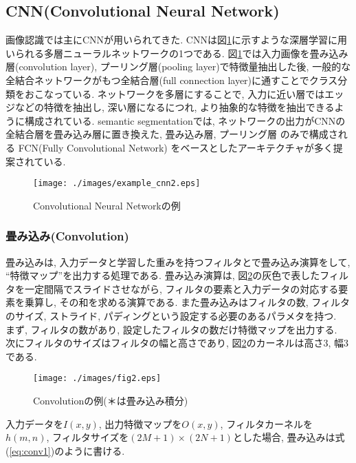 \subsection{CNN(Convolutional Neural Network)}\label{subsec:cnn}
画像認識では主にCNN\cite{cnn}が用いられてきた. CNNは図\ref{fig:conv_ex}に示すような深層学習に用いられる多層ニューラルネットワークの1つである. 図\ref{fig:conv_ex}では入力画像を畳み込み層(convolution layer), プーリング層(pooling layer)で特徴量抽出した後, 一般的な全結合ネットワークがもつ全結合層(full connection layer)に通すことでクラス分類をおこなっている. ネットワークを多層にすることで, 入力に近い層ではエッジなどの特徴を抽出し, 深い層になるにつれ, より抽象的な特徴を抽出できるように構成されている. semantic segmentationでは, ネットワークの出力がCNNの全結合層を畳み込み層に置き換えた, 畳み込み層, プーリング層 のみで構成される FCN(Fully Convolutional Network)\cite{long2015fully} をベースとしたアーキテクチャが多く提案されている. 
\begin{figure}[H]
  \centering
  \texttt{[image: ./images/example\_cnn2.eps]}
  \caption{Convolutional Neural Networkの例}
  \label{fig:conv_ex}
\end{figure}
\subsubsection*{畳み込み(Convolution)}
畳み込みは, 入力データと学習した重みを持つフィルタとで畳み込み演算をして, ``特徴マップ''を出力する処理である. 畳み込み演算は, 図\ref{fig:conv}の灰色で表したフィルタを一定間隔でスライドさせながら, フィルタの要素と入力データの対応する要素を乗算し, その和を求める演算である. また畳み込みはフィルタの数, フィルタのサイズ, ストライド, パディングという設定する必要のあるパラメタを持つ. \\
まず, フィルタの数があり, 設定したフィルタの数だけ特徴マップを出力する. \\
次にフィルタのサイズはフィルタの幅と高さであり, 図\ref{fig:conv}のカーネルは高さ3, 幅3である. 
\begin{figure}[H]
    \centering
    \texttt{[image: ./images/fig2.eps]}
    \caption{Convolutionの例(＊は畳み込み積分)}
    \label{fig:conv}
\end{figure}

入力データを$I(x, y)$, 出力特徴マップを$O(x, y)$, フィルタカーネルを$h(m, n)$, フィルタサイズを$(2M+1)\times(2N+1)$とした場合, 畳み込みは式(\ref{eq:conv1})のように書ける.

